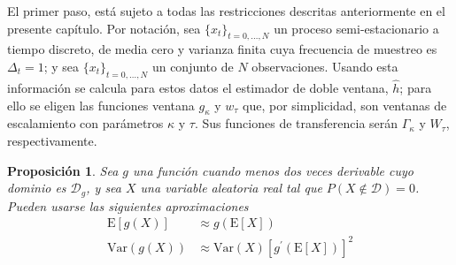 \documentclass[12pt,letterpaper]{book}
\newtheorem{proposicion}[teorema]{Proposición}
\newcommand{\prima}{^{\prime}}
\newcommand{\E}[1]{\mathrm{E}\left[ #1 \right]}
\newcommand{\Var}[1]{\mathrm{Var}\left( #1 \right)}
\newcommand{\xtd}{$\{x_t\}_{t=0,\dots,N}$ }
\begin{document}

El primer paso, está sujeto a todas las restricciones descritas anteriormente en el presente capítulo.
%
Por notación, sea \xtd un proceso semi-estacionario a tiempo discreto, de media cero y varianza finita cuya frecuencia de muestreo es $\Delta_t=1$; y sea \xtd un conjunto de $N$ observaciones.
%
Usando esta información se calcula para estos datos el estimador de doble ventana, $\widehat{h}$; para ello se eligen las funciones ventana $g_\kappa$ y $w_\tau$ que, por simplicidad, son ventanas de escalamiento con parámetros $\kappa$ y $\tau$. 
%
Sus funciones de transferencia serán $\Gamma_\kappa$ y $W_\tau$, respectivamente.

\begin{proposicion}
Sea $g$ una función cuando menos dos veces derivable cuyo dominio es $\mathcal{D}_g$, y sea $X$ una variable aleatoria real tal que $P(X\notin \mathcal{D}) = 0$. 
%
Pueden usarse las siguientes aproximaciones
\begin{align}
\E{g(X)} &\approx g\left( \E{X} \right) \\
\Var{g(X)} &\approx \Var{X} \left[ g\prima \left( \E{X} \right) \right]^{2}
\end{align}
\end{proposicion}
\end{document}
